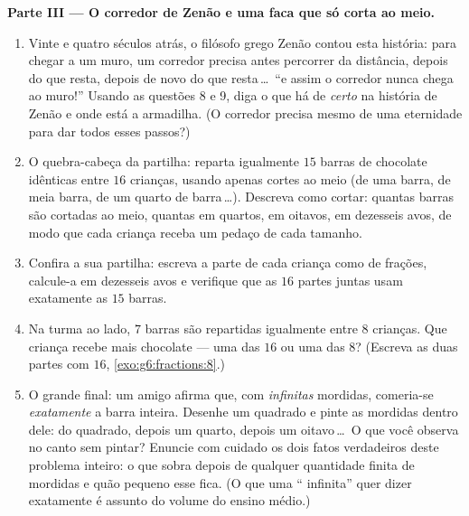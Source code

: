 \begin{problem}
\medskip
\noindent\textbf{Parte III --- O corredor de Zenão e uma faca que só
corta ao meio.}
\begin{enumerate}[resume]
  \item Vinte e quatro séculos atrás, o filósofo grego Zenão contou
        esta história: para chegar a um muro, um corredor precisa antes
        percorrer  da distância, depois  do que resta,
        depois de novo  do que resta\,\dots\ ``e assim o corredor
        nunca chega ao muro!'' Usando as questões 8 e 9, diga o que há
        de \emph{certo} na história de Zenão e onde está a armadilha. (O
        corredor precisa mesmo de uma eternidade para dar todos esses
        passos?)
  \item O quebra-cabeça da partilha: reparta igualmente $15$ barras de
        chocolate idênticas entre $16$ crianças, usando apenas cortes ao
        meio (de uma barra, de meia barra, de um quarto de
        barra\,\dots). Descreva como cortar: quantas barras são
        cortadas ao meio, quantas em quartos, em oitavos, em dezesseis
        avos, de modo que cada criança receba um pedaço de cada
        tamanho.
  \item Confira a sua partilha: escreva a parte de cada criança como
         de frações, calcule-a em dezesseis avos e verifique que as
        $16$ partes juntas usam exatamente as $15$ barras.
  \item Na turma ao lado, $7$ barras são repartidas igualmente entre
        $8$ crianças. Que criança recebe mais chocolate --- uma das
        $16$ ou uma das $8$? (Escreva as duas partes com 
        $16$, \cref{exo:g6:fractions:8}.)
  \item O grande final: um amigo afirma que, com \emph{infinitas}
        mordidas, comeria-se \emph{exatamente} a barra inteira. Desenhe
        um quadrado e pinte as mordidas dentro dele:  do
        quadrado, depois um quarto, depois um oitavo\,\dots\ O que você
        observa no canto sem pintar? Enuncie com cuidado os dois fatos
        verdadeiros deste problema inteiro: o que sobra depois de
        qualquer quantidade finita de mordidas e quão pequeno esse
         fica. (O que uma `` infinita'' quer dizer exatamente
        é assunto do volume do ensino médio.)
\end{enumerate}
\end{problem}

